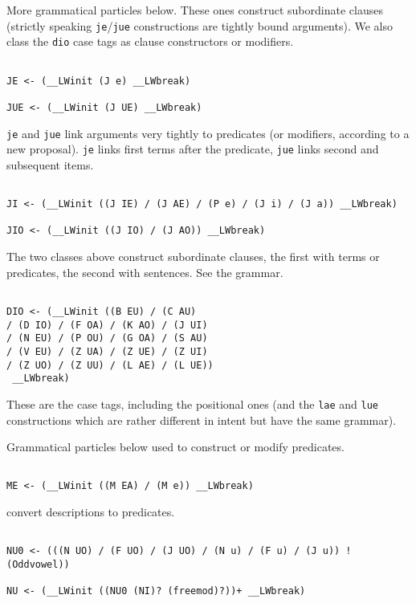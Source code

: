 \documentclass[12pt]{article}
\begin{document}
More grammatical particles below.  These ones construct subordinate clauses (strictly speaking {\tt je}/{\tt jue} constructions are tightly bound arguments).  We also class the {\tt dio} case tags as clause constructors or modifiers.

\begin{verbatim}

JE <- (__LWinit (J e) __LWbreak)

JUE <- (__LWinit (J UE) __LWbreak)

\end{verbatim}

{\tt je} and {\tt jue} link arguments very tightly to predicates (or modifiers, according to a new proposal).  {\tt je} links
first terms after the predicate, {\tt jue} links second and subsequent items.

\begin{verbatim}

JI <- (__LWinit ((J IE) / (J AE) / (P e) / (J i) / (J a)) __LWbreak)

JIO <- (__LWinit ((J IO) / (J AO)) __LWbreak)

\end{verbatim}

The two classes above construct subordinate clauses, the first with terms or predicates, the second with sentences.  See the grammar.

\begin{verbatim}

DIO <- (__LWinit ((B EU) / (C AU) 
/ (D IO) / (F OA) / (K AO) / (J UI) 
/ (N EU) / (P OU) / (G OA) / (S AU) 
/ (V EU) / (Z UA) / (Z UE) / (Z UI) 
/ (Z UO) / (Z UU) / (L AE) / (L UE))
 __LWbreak)

\end{verbatim}

These are the case tags, including the positional ones  (and the {\tt lae} and {\tt lue} constructions which are rather different in intent but have the same grammar).

Grammatical particles below used to construct or modify predicates.

\begin{verbatim}

ME <- (__LWinit ((M EA) / (M e)) __LWbreak)

\end{verbatim}

convert descriptions to predicates.

\begin{verbatim}

NU0 <- (((N UO) / (F UO) / (J UO) / (N u) / (F u) / (J u)) !(Oddvowel))

NU <- (__LWinit ((NU0 (NI)? (freemod)?))+ __LWbreak)

\end{verbatim}
\end{document}
